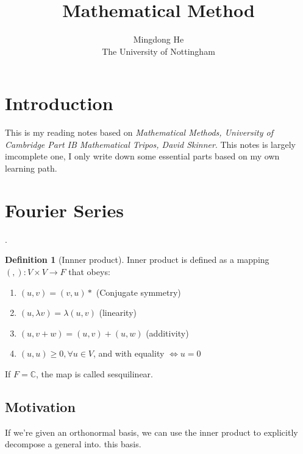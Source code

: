 \documentclass{article}
\theoremstyle{definition}
\newtheorem{definition}{Definition}[section]
\begin{document}

\title{Mathematical Method} %
\author{Mingdong He\\The University of Nottingham} 

\maketitle

\tableofcontents
%
\section{Introduction}
This is my reading notes based on \textit{Mathematical Methods,  University of Cambridge Part IB Mathematical Tripos,  David Skinner}.  This notes is largely imcomplete one, I only write down some essential parts based on my own learning path.

\section{Fourier Series}.
\begin{definition}[Innner product]
Inner product is defined as a mapping $(,):V \times V \to F$ that obeys:
\begin{enumerate}
	\item $(u,v)=(v,u)*$ (Conjugate symmetry)
	\item $(u,\lambda v)=\lambda(u,v)$ (linearity)
	\item $(u,v+w)=(u,v)+(u,w)$ (additivity)
	\item $(u,u) \geq 0, \forall u \in V$, and with equality $\iff u=0$
\end{enumerate}
\end{definition}

If $F=\mathbb{C}$, the map is called sesquilinear.


\subsection{Motivation}
If we're given an orthonormal basis, we can use the inner product to explicitly decompose a general into. this basis. 
\end{document}
